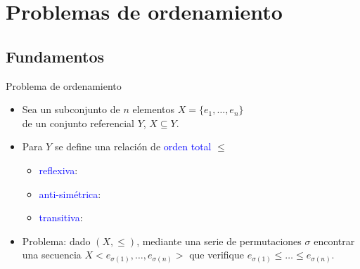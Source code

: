 \documentclass{beamer} %
\newcommand{\blue}[1]{\textcolor{blue}{#1}}
\begin{document}

\section{Problemas de ordenamiento}

\subsection{Fundamentos}

\begin{frame}{Problema de ordenamiento}
    \begin{itemize}
        \item<1-> Sea un subconjunto de $n$ elementos $X=\{e_1,\ldots,e_n\}$\\
        de un conjunto referencial $Y$, $X\subseteq Y$.
        \item<1-> Para $Y$ se define una relación de \blue{orden total} $\leq$
        \begin{itemize}
            \item<2-> \blue{reflexiva}: \tabto{15ex} 
            \item<2-> \blue{anti-simétrica}: \tabto{15ex} 
            \item<2-> \blue{transitiva}:\tabto{15ex} 
        \end{itemize}
        \item<6-> Problema: dado $(X,\leq)$, mediante una serie de permutaciones $\sigma$ encontrar una secuencia $X <e_{\sigma(1)},\ldots,e_{\sigma(n)}>$ que verifique $e_{\sigma(1)}\leq\ldots\leq e_{\sigma(n)}$.
    \end{itemize}
\end{frame}
\end{document}
